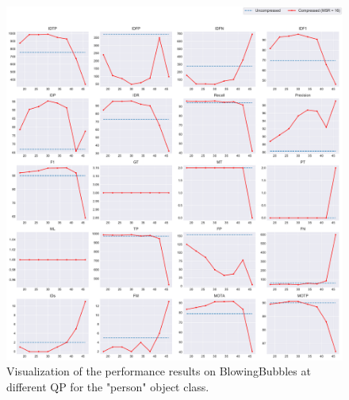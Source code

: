 \begin{figure}[!tb]
  \centering
  \includegraphics[width=1.0\linewidth]{img/BlowingBubbles_0_multiplots_qp.pdf}
  \caption[Visualization of the performance results on BlowingBubbles at different QP for the "person" object class]
  {
    Visualization of the performance results on BlowingBubbles at different QP for the "person" object class.
  }
  \label{fig:BlowingBubbles_0_multiplots_qp}
\end{figure}